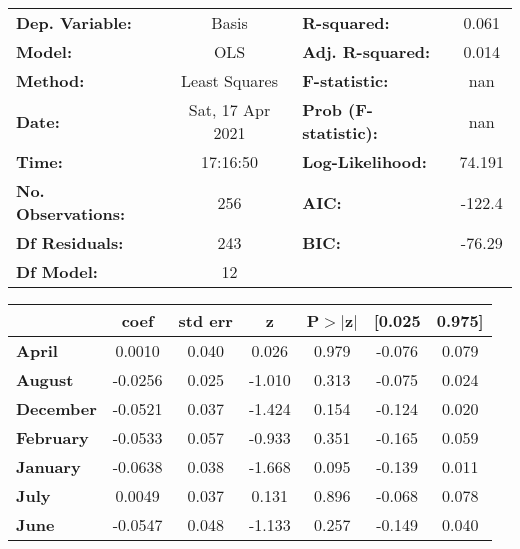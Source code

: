 \begin{center}
\begin{tabular}{lclc}
\toprule
\textbf{Dep. Variable:}    &      Basis       & \textbf{  R-squared:         } &     0.061   \\
\textbf{Model:}            &       OLS        & \textbf{  Adj. R-squared:    } &     0.014   \\
\textbf{Method:}           &  Least Squares   & \textbf{  F-statistic:       } &       nan   \\
\textbf{Date:}             & Sat, 17 Apr 2021 & \textbf{  Prob (F-statistic):} &      nan    \\
\textbf{Time:}             &     17:16:50     & \textbf{  Log-Likelihood:    } &    74.191   \\
\textbf{No. Observations:} &         256      & \textbf{  AIC:               } &    -122.4   \\
\textbf{Df Residuals:}     &         243      & \textbf{  BIC:               } &    -76.29   \\
\textbf{Df Model:}         &          12      & \textbf{                     } &             \\
\bottomrule
\end{tabular}
\begin{tabular}{lcccccc}
                   & \textbf{coef} & \textbf{std err} & \textbf{z} & \textbf{P$> |$z$|$} & \textbf{[0.025} & \textbf{0.975]}  \\
\midrule
\textbf{April}     &       0.0010  &        0.040     &     0.026  &         0.979        &       -0.076    &        0.079     \\
\textbf{August}    &      -0.0256  &        0.025     &    -1.010  &         0.313        &       -0.075    &        0.024     \\
\textbf{December}  &      -0.0521  &        0.037     &    -1.424  &         0.154        &       -0.124    &        0.020     \\
\textbf{February}  &      -0.0533  &        0.057     &    -0.933  &         0.351        &       -0.165    &        0.059     \\
\textbf{January}   &      -0.0638  &        0.038     &    -1.668  &         0.095        &       -0.139    &        0.011     \\
\textbf{July}      &       0.0049  &        0.037     &     0.131  &         0.896        &       -0.068    &        0.078     \\
\textbf{June}      &      -0.0547  &        0.048     &    -1.133  &         0.257        &       -0.149    &        0.040     \\

\end{tabular}
\end{center}
